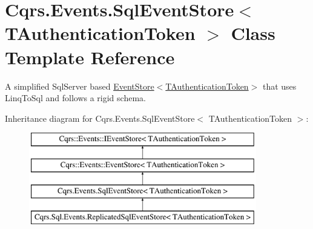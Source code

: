 \hypertarget{classCqrs_1_1Events_1_1SqlEventStore}{}\section{Cqrs.\+Events.\+Sql\+Event\+Store$<$ T\+Authentication\+Token $>$ Class Template Reference}
\label{classCqrs_1_1Events_1_1SqlEventStore}


A simplified Sql\+Server based \hyperlink{classCqrs_1_1Events_1_1EventStore_a6346cb2aea4c5b4e740dc6cfb15abab8_a6346cb2aea4c5b4e740dc6cfb15abab8}{Event\+Store$<$\+T\+Authentication\+Token$>$} that uses Linq\+To\+Sql and follows a rigid schema.  


Inheritance diagram for Cqrs.\+Events.\+Sql\+Event\+Store$<$ T\+Authentication\+Token $>$\+:\begin{figure}[H]
\begin{center}
\leavevmode
\includegraphics[height=4.000000cm]{classCqrs_1_1Events_1_1SqlEventStore}
\end{center}
\end{figure}
